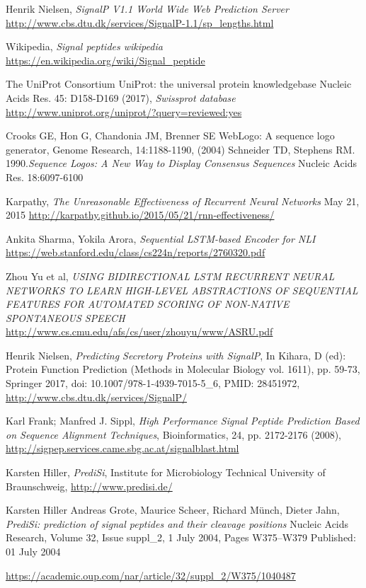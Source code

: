 \begin{thebibliography}{9}

 Henrik Nielsen, {\em SignalP V1.1 World Wide Web Prediction Server}
\url{http://www.cbs.dtu.dk/services/SignalP-1.1/sp_lengths.html}

 Wikipedia, {\em Signal peptides wikipedia}
\url{https://en.wikipedia.org/wiki/Signal_peptide}

 The UniProt Consortium
UniProt: the universal protein knowledgebase
Nucleic Acids Res. 45: D158-D169 (2017), {\em Swissprot database}
\url{http://www.uniprot.org/uniprot/?query=reviewed:yes}

 Crooks GE, Hon G, Chandonia JM, Brenner SE WebLogo: A sequence logo generator, Genome Research, 14:1188-1190, (2004)
Schneider TD, Stephens RM. 1990.{\em Sequence Logos: A New Way to Display Consensus Sequences} Nucleic Acids Res. 18:6097-6100

 Karpathy, {\em The Unreasonable Effectiveness of Recurrent Neural Networks}
May 21, 2015
\url{http://karpathy.github.io/2015/05/21/rnn-effectiveness/}

 Ankita Sharma, Yokila Arora, {\em Sequential LSTM-based Encoder for NLI}
\url{https://web.stanford.edu/class/cs224n/reports/2760320.pdf}

 Zhou Yu et al, {\em USING BIDIRECTIONAL LSTM RECURRENT NEURAL NETWORKS TO LEARN HIGH-LEVEL ABSTRACTIONS OF SEQUENTIAL FEATURES FOR AUTOMATED SCORING OF NON-NATIVE SPONTANEOUS SPEECH}
\url{http://www.cs.cmu.edu/afs/cs/user/zhouyu/www/ASRU.pdf}

 Henrik Nielsen,
{\em Predicting Secretory Proteins with SignalP},
In Kihara, D (ed): Protein Function Prediction (Methods in Molecular Biology vol. 1611),  pp. 59-73, Springer 2017, doi: 10.1007/978-1-4939-7015-5\_6, PMID: 28451972, 
\url{http://www.cbs.dtu.dk/services/SignalP/}  %

 Karl Frank; Manfred J. Sippl,
{\em High Performance Signal Peptide Prediction Based on Sequence Alignment Techniques},
Bioinformatics, 24, pp. 2172-2176 (2008), \url{http://sigpep.services.came.sbg.ac.at/signalblast.html}

  Karsten Hiller,
{\em PrediSi}, Institute for Microbiology Technical University of Braunschweig, 
\url{http://www.predisi.de/}

 Karsten Hiller  Andreas Grote, Maurice Scheer, Richard Münch, Dieter Jahn, {\em PrediSi: prediction of signal peptides and their cleavage positions}
Nucleic Acids Research, Volume 32, Issue suppl\_2, 1 July 2004, Pages W375–W379
Published: 01 July 2004

\url{https://academic.oup.com/nar/article/32/suppl_2/W375/1040487}

\end{thebibliography}

